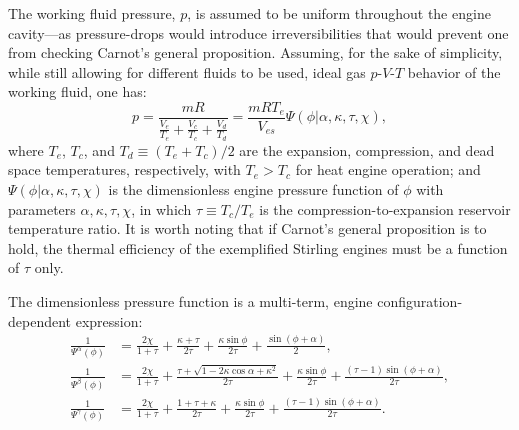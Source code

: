     The working fluid pressure, $p$, is assumed to be uniform throughout the engine  cavity---as
    pressure-drops would introduce  irreversibilities  that  would  prevent  one  from  checking
    Carnot's general proposition. Assuming, for the sake of simplicity, while still allowing for
    different fluids to be used, ideal gas $p$-$V$-$T$ behavior of the working fluid, one has:
    \begin{equation}
        \label{eq:P}
        p = \frac{mR}{\frac{V_e}{T_e} + \frac{V_c}{T_c} + \frac{V_d}{T_d}} = \frac{mRT_e}{V_{es}}\Psi(\phi | \alpha, \kappa, \tau, \chi),
    \end{equation}
    \noindent where $T_e$, $T_c$, and $T_d \equiv (T_e + T_c)/2$ are the expansion, compression,
    and dead space temperatures, respectively, with $T_e > T_c$ for heat engine  operation;  and
    $\Psi(\phi | \alpha, \kappa, \tau, \chi)$ is the dimensionless engine pressure  function  of
    $\phi$ with parameters $\alpha, \kappa, \tau, \chi$, in which $\tau \equiv T_c / T_e$ is the
    compression-to-expansion reservoir temperature ratio. It is worth noting  that  if  Carnot's
    general proposition is to hold, the thermal efficiency of the exemplified  Stirling  engines
    must be a function of $\tau$ only.

    The  dimensionless  pressure  function  is  a  multi-term,  engine   configuration-dependent
    expression:
    \begin{align}
        \label{eq:Psia}
        \frac{1}{\Psi^{\alpha}(\phi)} &=
                \frac{2\chi}{1 + \tau} +
                \frac{\kappa + \tau}{2\tau} +
                \frac{\kappa\sin\phi}{2\tau} +
                \frac{\sin(\phi + \alpha)}{2},\\
        \label{eq:Psib}
        \frac{1}{\Psi^{\beta}(\phi)}  &=
                \frac{2\chi}{1 + \tau} +
                \frac{\tau + \sqrt{1 - 2\kappa\cos\alpha + \kappa^2}}{2\tau} +
                \frac{\kappa\sin\phi}{2\tau} +
                \frac{(\tau - 1)\sin(\phi + \alpha)}{2\tau},\\
        \label{eq:Psig}
        \frac{1}{\Psi^{\gamma}(\phi)} &=
                \frac{2\chi}{1 + \tau} +
                \frac{1 + \tau + \kappa}{2\tau} +
                \frac{\kappa\sin\phi}{2\tau} +
                \frac{(\tau - 1)\sin(\phi + \alpha)}{2\tau}.
    \end{align}


